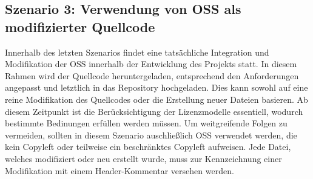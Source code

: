 \subsection{Szenario 3: Verwendung von OSS als modifizierter Quellcode}

Innerhalb des letzten Szenarios findet eine tatsächliche Integration und Modifikation der OSS innerhalb der Entwicklung des Projekts statt. In diesem Rahmen wird der Quellcode heruntergeladen, entsprechend den Anforderungen angepasst und letztlich in das Repository hochgeladen. Dies kann sowohl auf eine reine Modifikation des Quellcodes oder die Erstellung neuer Dateien basieren. Ab diesem Zeitpunkt ist die Berücksichtigung der Lizenzmodelle essentiell, wodurch bestimmte Bedinungen erfüllen werden müssen. Um weitgreifende Folgen zu vermeiden, sollten in diesem Szenario auschließlich OSS verwendet werden, die kein Copyleft oder teilweise ein beschränktes Copyleft aufweisen. Jede Datei, welches modifiziert oder neu erstellt wurde, muss zur Kennzeichnung einer Modifikation mit einem Header-Kommentar versehen werden.

